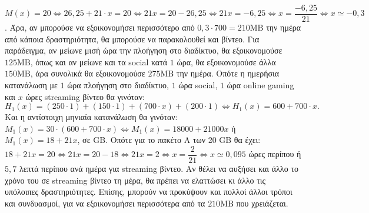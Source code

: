 \begin{alist}
\item $M(x) = 20 \Leftrightarrow 26,25 + 21 \cdot x = 20 \Leftrightarrow 21x = 20 - 26,25 \Leftrightarrow 21x = -6,25 \Leftrightarrow x = \dfrac{-6,25}{21} \Leftrightarrow x \simeq -0,3$.
Άρα, αν μπορούσε να εξοικονομήσει περισσότερο από $0,3 \cdot 700 = 210\text{MB}$ την ημέρα από κάποια δραστηριότητα, θα μπορούσε να παρακολουθεί και βίντεο.
Για παράδειγμα, αν μείωνε μισή ώρα την πλοήγηση στο διαδίκτυο, θα εξοικονομούσε $125\text{MB}$, όπως και αν μείωνε και τα social κατά $1$ ώρα, θα εξοικονομούσε άλλα $150\text{MB}$, άρα συνολικά θα εξοικονομούσε $275\text{MB}$ την ημέρα.
Οπότε η ημερήσια κατανάλωση με $1$ ώρα πλοήγηση στο διαδίκτυο, $1$ ώρα social, $1$ ώρα online gaming και $x$ ώρες streaming βίντεο θα γινόταν:
\[H_1(x) = (250 \cdot 1) + (150 \cdot 1) + (700 \cdot x) + (200 \cdot 1) \Leftrightarrow H_1(x) = 600 + 700 \cdot x.\]
Και η αντίστοιχη μηνιαία κατανάλωση θα γινόταν:
$M_1(x) = 30 \cdot (600 + 700 \cdot x) \Leftrightarrow M_1(x) = 18000 + 21000x$ ή $M_1(x) = 18 + 21x$, σε GB.
Οπότε για το πακέτο Α των 20 GB θα έχει:
$18 + 21x = 20 \Leftrightarrow 21x = 20 - 18 \Leftrightarrow 21x = 2 \Leftrightarrow x = \dfrac{2}{21} \Leftrightarrow x \simeq 0,095$ ώρες περίπου ή $5,7$ λεπτά περίπου ανά ημέρα για streaming βίντεο. Αν θέλει να αυξήσει και άλλο το χρόνο του σε streaming βίντεο τη μέρα, θα πρέπει να ελαττώσει κι άλλο τις υπόλοιπες δραστηριότητες.
Επίσης, μπορούν να προκύψουν και πολλοί άλλοι τρόποι και συνδυασμοί, για να εξοικονομήσει περισσότερα από τα $210\text{MB}$ που χρειάζεται.
\end{alist}

